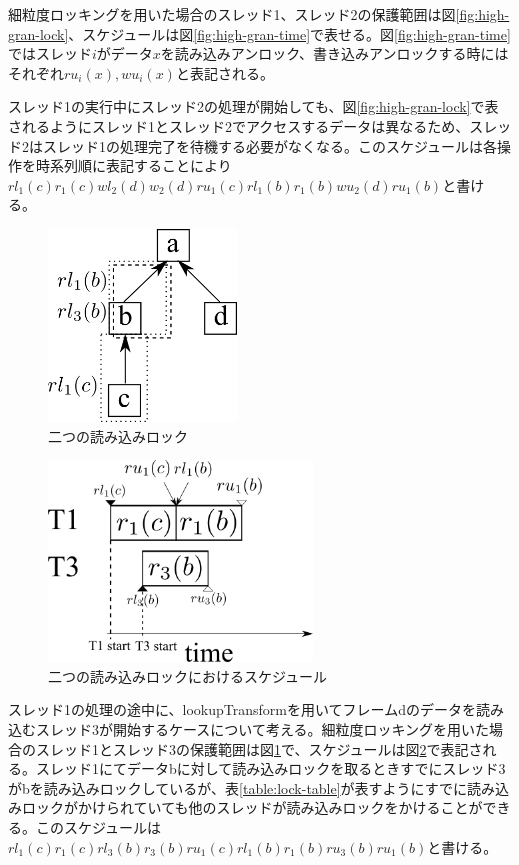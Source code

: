 \documentclass[a4paper]{jreport}	%
\begin{document}
細粒度ロッキングを用いた場合のスレッド1、スレッド2の保護範囲は図\ref{fig:high-gran-lock}、スケジュールは図\ref{fig:high-gran-time}で表せる。図\ref{fig:high-gran-time}ではスレッド$i$がデータ$x$を読み込みアンロック、書き込みアンロックする時にはそれぞれ$ru_i(x), wu_i(x)$と表記される。

スレッド1の実行中にスレッド2の処理が開始しても、図\ref{fig:high-gran-lock}で表されるようにスレッド1とスレッド2でアクセスするデータは異なるため、スレッド2はスレッド1の処理完了を待機する必要がなくなる。このスケジュールは各操作を時系列順に表記することにより$rl_1(c)r_1(c)wl_2(d)w_2(d)ru_1(c)rl_1(b)r_1(b)wu_2(d)ru_1(b)$と書ける。


\begin{figure}[h] 
\centering
\includegraphics[width=5cm]{two-read-lock}
\caption{二つの読み込みロック}
\label{fig:two-read-lock}
\end{figure}


\begin{figure}[h] 
\centering
\includegraphics[width=7cm]{two-read-lock-time}
\caption{二つの読み込みロックにおけるスケジュール}
\label{fig:two-read-lock-time}
\end{figure}

スレッド1の処理の途中に、lookupTransformを用いてフレームdのデータを読み込むスレッド3が開始するケースについて考える。細粒度ロッキングを用いた場合のスレッド1とスレッド3の保護範囲は図\ref{fig:two-read-lock}で、スケジュールは図\ref{fig:two-read-lock-time}で表記される。スレッド1にてデータbに対して読み込みロックを取るときすでにスレッド3がbを読み込みロックしているが、表\ref{table:lock-table}が表すようにすでに読み込みロックがかけられていても他のスレッドが読み込みロックをかけることができる。このスケジュールは$rl_1(c)r_1(c)rl_3(b)r_3(b)ru_1(c)rl_1(b)r_1(b)ru_3(b)ru_1(b)$と書ける。
\end{document}
